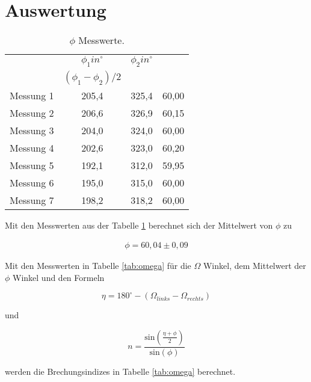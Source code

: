 \section{Auswertung}
\label{sec:Auswertung}
\begin{table}
  \centering
  \caption{$\phi$ Messwerte.}
  \label{tab:phi}
\begin{tabular}{c c c c}
  \toprule
  & $\phi_1 in ^\circ$ & $\phi_2 in ^\circ$\\ & $(\phi_1 - \phi_2)/2$ \\
  \midrule
  Messung 1  &  205,4  &  325,4  &  60,00 \\
  Messung 2  &  206,6  &  326,9  &  60,15 \\
  Messung 3  &  204,0  &  324,0  &  60,00 \\
  Messung 4  &  202,6  &  323,0  &  60,20 \\
  Messung 5  &  192,1  &  312,0  &  59,95 \\
  Messung 6  &  195,0  &  315,0  &  60,00 \\
  Messung 7  &  198,2  &  318,2  &  60,00 \\
  \bottomrule
\end{tabular}
\end{table}
\FloatBarrier

Mit den Messwerten aus der Tabelle \ref{tab:phi} berechnet sich der Mittelwert von $\phi$ zu

\begin{align*}
  \phi = 60,04 \pm 0,09
\end{align*}


Mit den Messwerten in Tabelle \ref{tab:omega} für die $\Omega$ Winkel, dem Mittelwert der $\phi$ Winkel und den Formeln

\begin{equation}
  \eta = 180^\circ - (\Omega_{links} - \Omega_{rechts})
  \label{eqn:glausw1}
\end{equation}

und

\begin{equation}
  n = \frac{\text{sin}\left(\frac{\eta + \phi}{2}\right)}{\text{sin} \left(\phi\right)}
  \label{eqn:glausw1}
\end{equation}

werden die Brechungsindizes in Tabelle \ref{tab:omega} berechnet.

